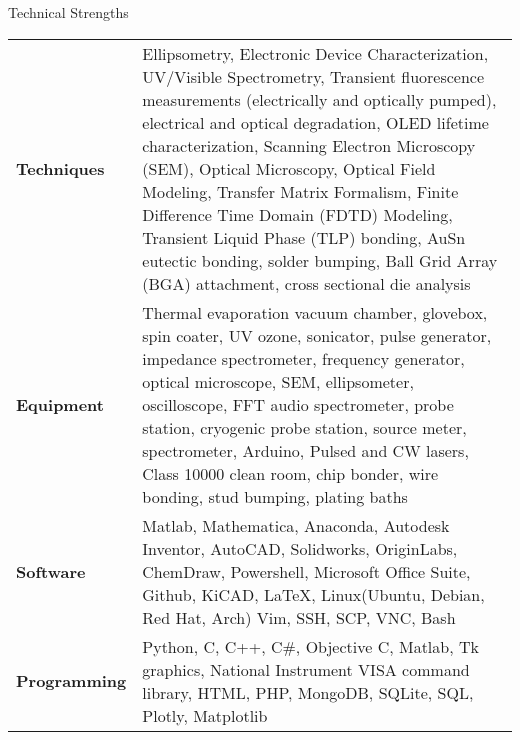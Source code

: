 \documentclass{resume} %
\begin{document}
\begin{rSection}{Technical Strengths}

\begin{tabular}{ @{} >{\hspace{-0.5em}\bfseries}l @{\hspace{3ex}} p{14.25cm} }
Techniques & Ellipsometry, Electronic Device Characterization, UV/Visible Spectrometry, Transient fluorescence measurements (electrically and optically pumped), electrical and optical degradation, OLED lifetime characterization, Scanning Electron Microscopy (SEM), Optical Microscopy, Optical Field Modeling, Transfer Matrix Formalism, Finite Difference Time Domain (FDTD) Modeling, Transient Liquid Phase (TLP) bonding, AuSn eutectic bonding, solder bumping, Ball Grid Array (BGA) attachment, cross sectional die analysis \\
Equipment & Thermal evaporation vacuum chamber, glovebox, spin coater, UV ozone, sonicator, pulse generator, impedance spectrometer, frequency generator, optical microscope, SEM, ellipsometer, oscilloscope, FFT audio spectrometer, probe station, cryogenic probe station, source meter, spectrometer, Arduino, Pulsed and CW lasers, Class 10000 clean room, chip bonder, wire bonding, stud bumping, plating baths \\
Software & Matlab, Mathematica, Anaconda, Autodesk Inventor, AutoCAD, Solidworks, OriginLabs, ChemDraw, Powershell, Microsoft Office Suite, Github, KiCAD, \LaTeX , Linux(Ubuntu, Debian, Red Hat, Arch) Vim, SSH, SCP, VNC, Bash \\
Programming & Python, C, C++, C\#, Objective C, Matlab, Tk graphics, National Instrument VISA command library, HTML, PHP, MongoDB, SQLite, SQL, Plotly, Matplotlib \\
\end{tabular}

\end{rSection}

\end{document}
